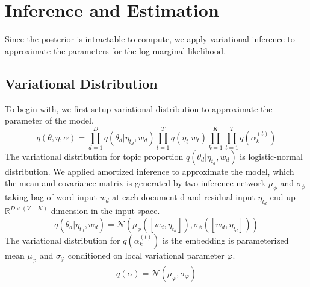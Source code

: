 \section{Inference and Estimation}
Since the posterior is intractable to compute, we apply variational inference to approximate the parameters for the log-marginal likelihood.
\subsection{Variational Distribution}
To begin with, we first setup variational distribution to approximate the parameter of the model. 
\begin{equation}
q(\theta,\eta,\alpha)=\prod_{d=1}^{D}q(\theta_d|\eta_{t_d},w_d)\prod_{t=1}^{T}q(\eta_t|w_t)\prod_{k=1}^{K}\prod_{t=1}^{T}q(\alpha_k^{(t)})
\end{equation}
The variational distribution for topic proportion $ q(\theta_d|\eta_{t_d},w_d) $ is logistic-normal distribution. We applied amortized inference to approximate the model, which the mean and covariance matrix is generated by two inference network $ \mu_\phi $ and $ \sigma_\phi $ taking bag-of-word input $ w_d $ at each document d and residual input $ \eta_{t_d} $ end up $ \mathbb{R}^{D\times (V+K)} $ dimension in the input space.
\begin{equation}\label{eq:ch5_variational_theta}
q(\theta_d|\eta_{t_d},w_d)=\mathcal{N}(\mu_\phi([w_d,\eta_{t_d}]),\sigma_\phi([w_{d},\eta_{t_d}]))
\end{equation}
The variational distribution for $ q(\alpha_k^{(t)}) $ is the embedding is parameterized mean $ \mu_{\varphi} $ and $ \sigma_{\varphi} $ conditioned on local variational parameter $ \varphi $. 
\begin{align*}
q(\alpha)=\mathcal{N}(\mu_\varphi,\sigma_\varphi)
\end{align*}

